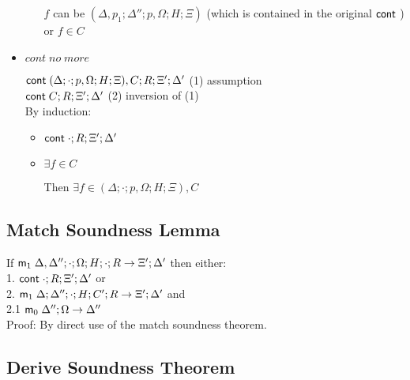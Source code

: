 \documentclass[9pt]{article}
\begin{document}
\begin{itemize}
\begin{itemize}
      $f$ can be $(\Delta, p_1; \Delta''; p, \Omega; H; \Xi)$ (which is contained in the original $\mathsf{cont} \;$)\\
      or $f \in C$\\
      
   \end{itemize}
   
   \item $cont \; no \; more$
   
   $\mathsf{cont} \; (\Delta; \cdot; p, \Omega; H; \Xi), C; R; \Xi'; \Delta'$ \hfill (1) assumption \\
   $\mathsf{cont} \; C; R; \Xi'; \Delta'$ \hfill (2) inversion of (1) \\
   
   By induction:
   
   \begin{itemize}
      \item $\mathsf{cont} \; \cdot; R; \Xi'; \Delta'$
      
      \item $\exists f \in C$
      
      Then $\exists f \in (\Delta; \cdot; p, \Omega; H; \Xi), C$ \\
   \end{itemize}
   
\end{itemize}

\subsection{Match Soundness Lemma}

If $\mathsf{m}_1 \; \Delta, \Delta''; \cdot; \Omega; H; \cdot; R \rightarrow \Xi'; \Delta'$ then either:\\
1. \hspace{1cm} $\mathsf{cont} \; \cdot; R; \Xi'; \Delta'$ or \\
2. \hspace{1cm} $\mathsf{m}_1 \; \Delta; \Delta''; \cdot; H; C'; R \rightarrow \Xi'; \Delta'$ and\\
2.1 \hspace{2cm} $\mathsf{m}_0 \; \Delta''; \Omega \rightarrow \Delta''$\\

Proof: By direct use of the match soundness theorem.

\subsection{Derive Soundness Theorem}
\end{document}
